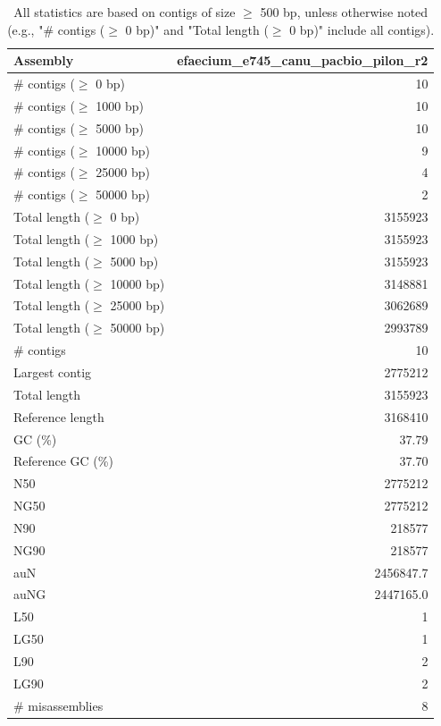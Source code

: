 \documentclass[12pt,a4paper]{article}
\begin{document}
\begin{table}[ht]
\begin{center}
\caption{All statistics are based on contigs of size $\geq$ 500 bp, unless otherwise noted (e.g., "\# contigs ($\geq$ 0 bp)" and "Total length ($\geq$ 0 bp)" include all contigs).}
\begin{tabular}{|l*{1}{|r}|}
\hline
Assembly & efaecium\_e745\_canu\_pacbio\_pilon\_r2 \\ \hline
\# contigs ($\geq$ 0 bp) & 10 \\ \hline
\# contigs ($\geq$ 1000 bp) & 10 \\ \hline
\# contigs ($\geq$ 5000 bp) & 10 \\ \hline
\# contigs ($\geq$ 10000 bp) & 9 \\ \hline
\# contigs ($\geq$ 25000 bp) & 4 \\ \hline
\# contigs ($\geq$ 50000 bp) & 2 \\ \hline
Total length ($\geq$ 0 bp) & 3155923 \\ \hline
Total length ($\geq$ 1000 bp) & 3155923 \\ \hline
Total length ($\geq$ 5000 bp) & 3155923 \\ \hline
Total length ($\geq$ 10000 bp) & 3148881 \\ \hline
Total length ($\geq$ 25000 bp) & 3062689 \\ \hline
Total length ($\geq$ 50000 bp) & 2993789 \\ \hline
\# contigs & 10 \\ \hline
Largest contig & 2775212 \\ \hline
Total length & 3155923 \\ \hline
Reference length & 3168410 \\ \hline
GC (\%) & 37.79 \\ \hline
Reference GC (\%) & 37.70 \\ \hline
N50 & 2775212 \\ \hline
NG50 & 2775212 \\ \hline
N90 & 218577 \\ \hline
NG90 & 218577 \\ \hline
auN & 2456847.7 \\ \hline
auNG & 2447165.0 \\ \hline
L50 & 1 \\ \hline
LG50 & 1 \\ \hline
L90 & 2 \\ \hline
LG90 & 2 \\ \hline
\# misassemblies & 8 \\ \hline

\end{tabular}
\end{center}
\end{table}
\end{document}
